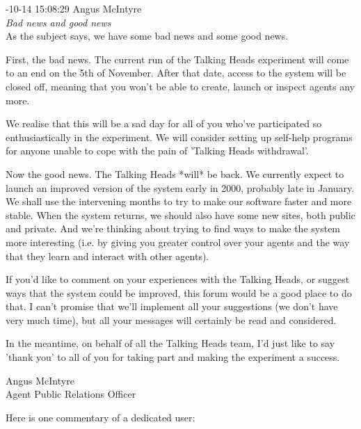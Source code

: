 \begin{mail}
{-10-14 15:08:29 Angus McIntyre}\\
{\itshape Bad news and good news}\\

As the subject says, we have some bad news and some good news.

First, the bad news. The current run of the Talking Heads experiment will come to an end on the 5th of November. After that date, access to the system will be closed off, meaning that you won't be able to create, launch or inspect agents any more.

We realise that this will be a sad day for all of you who've participated so enthusiastically in the experiment. We will consider setting up self-help programs for anyone unable to cope with the pain of 'Talking Heads withdrawal'.

Now the good news. The Talking Heads *will* be back. We currently expect to launch an improved version of the system early in 2000, probably late in January. We shall use the intervening months to try to make our software faster and more stable. When the system returns, we should also have some new sites, both public and private. And we're thinking about trying to find ways to make the system more interesting (i.e. by giving you greater control over your agents and the way that they learn and interact with other agents).

If you'd like to comment on your experiences with the Talking Heads, or suggest ways that the system could be improved, this forum would be a good place to do that. I can't promise that we'll implement all your suggestions (we don't have very much time), but all your messages will certainly be read and considered.

In the meantime, on behalf of all the Talking Heads team, I'd just like to say 'thank you' to all of you for taking part and making the experiment a success.

     Angus McIntyre\\
     Agent Public Relations Officer
\end{mail}

Here is one commentary of a dedicated user: \\

